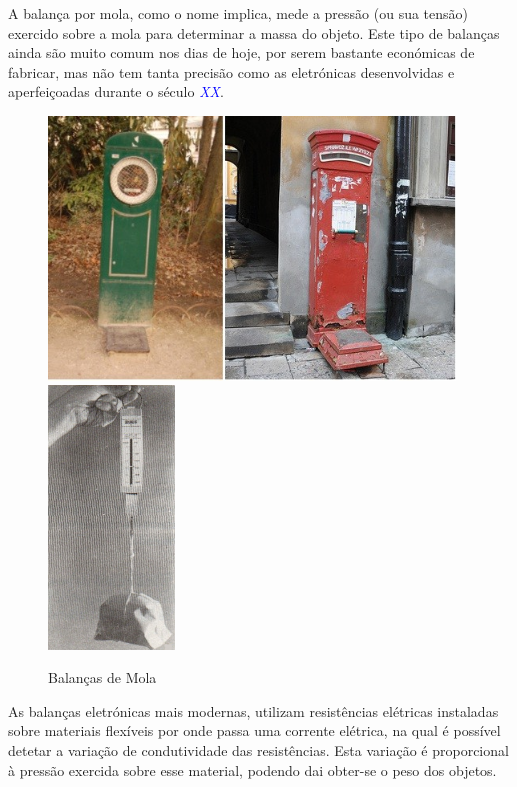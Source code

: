 A balança por mola, como o nome implica, mede a pressão (ou sua tensão) exercido sobre a mola para determinar a massa do objeto. Este tipo de balanças ainda são muito comum nos dias de hoje, por serem bastante económicas de fabricar, mas não tem tanta precisão como as eletrónicas desenvolvidas e aperfeiçoadas durante o século \textcolor{blue}{\textit{XX}}.
\newline
\newline
\begin{minipage}[!b]{\linewidth}
	\begin{figure}[H]
		\captionsetup{justification=raggedright,singlelinecheck=false}
		\flushleft
		\includegraphics[height=7cm]{./image/PESTA/general/Public_Body_Scales_1.jpg}
		\hspace{.8cm}
		\includegraphics[height=7cm]{./image/PESTA/general/Balanca_Mola_1.jpg}
		\caption{Balanças de Mola}
		\label{Balanca_Mola_1}
	\end{figure}
\end{minipage}
\newpage
As balanças eletrónicas mais modernas, utilizam resistências elétricas instaladas sobre materiais flexíveis por onde passa uma corrente elétrica, na qual é possível detetar a variação de condutividade das resistências. Esta variação é proporcional à pressão exercida sobre esse material, podendo dai obter-se o peso dos objetos.
